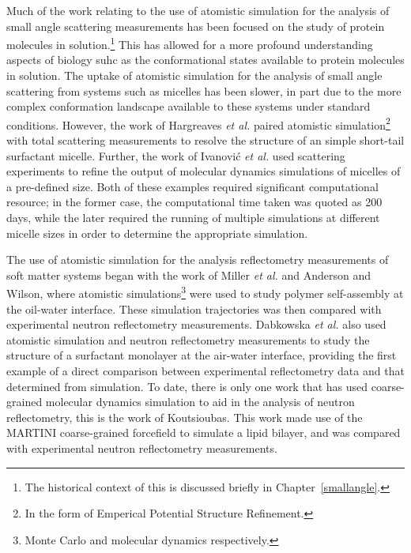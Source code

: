 Much of the work relating to the use of atomistic simulation for the analysis of small angle scattering measurements has been focused on the study of protein molecules in solution.\footnote{The historical context of this is discussed briefly in Chapter~\ref{smallangle}.}
This has allowed for a more profound understanding aspects of biology suhc as the conformational states available to protein molecules in solution.\autocite{bowerman_determining_2017}
The uptake of atomistic simulation for the analysis of small angle scattering from systems such as micelles has been slower, in part due to the more complex conformation landscape available to these systems under standard conditions.
However, the work of Hargreaves \emph{et al.} paired atomistic simulation\footnote{In the form of Emperical Potential Structure Refinement.} with total scattering measurements to resolve the structure of an simple short-tail surfactant micelle.\autocite{hargreaves_atomistic_2011}
Further, the work of Ivanovi\'{c} \emph{et al.} used scattering experiments to refine the output of molecular dynamics simulations of micelles of a pre-defined size.\autocite{ivanovic_temperature-dependent_2018}
Both of these examples required significant computational resource; in the former case, the computational time taken was quoted as 200 days, while the later required the running of multiple simulations at different micelle sizes in order to determine the appropriate simulation.

The use of atomistic simulation for the analysis reflectometry measurements of soft matter systems began with the work of Miller \emph{et al.} and Anderson and Wilson,\autocite{miller_monte_2003,anderson_molecular_2004} where atomistic simulations\footnote{Monte Carlo and molecular dynamics respectively.} were used to study polymer self-assembly at the oil-water interface.
These simulation trajectories was then compared with experimental neutron reflectometry measurements.
Dabkowska \emph{et al.} also used atomistic simulation and neutron reflectometry measurements to study the structure of a surfactant monolayer at the air-water interface, providing the first example of a direct comparison between experimental reflectometry data and that determined from simulation.\autocite{dabkowska_modulation_2014}
To date, there is only one work that has used coarse-grained molecular dynamics simulation to aid in the analysis of neutron reflectometry, this is the work of Koutsioubas.\autocite{koutsioubas_combined_2016}
This work made use of the MARTINI coarse-grained forcefield to simulate a lipid bilayer, and was compared with experimental neutron reflectometry measurements.
